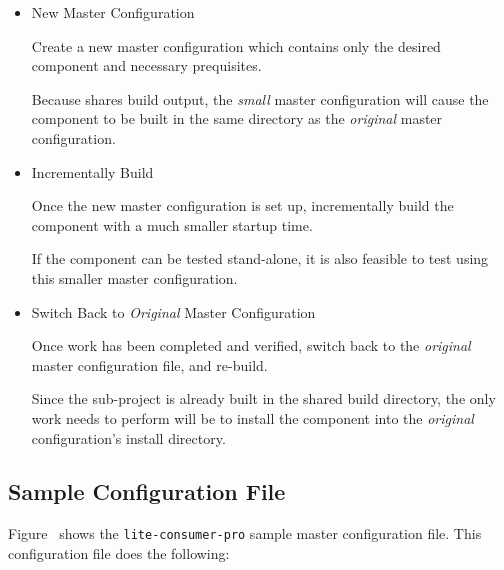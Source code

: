 \begin{itemize}
\item New Master Configuration

  Create a new master configuration which contains only the desired
  component and necessary prequisites.

  Because \lmsbw shares build output, the \emph{small} master
  configuration will cause the component to be built in the same
  directory as the \emph{original} master configuration.

\item Incrementally Build

  Once the new master configuration is set up, incrementally build the
  component with a much smaller startup time.

  If the component can be tested stand-alone, it is also feasible to
  test using this smaller master configuration.

\item Switch Back to \emph{Original} Master Configuration

  Once work has been completed and verified, switch back to the
  \emph{original} master configuration file, and re-build.

  Since the sub-project is already built in the shared build
  directory, the only work \lmsbw needs to perform will be to install
  the component into the \emph{original} configuration's install
  directory.
\end{itemize}

\subsection{Sample Configuration File}
Figure~ shows the
\texttt{lite-consumer-pro} sample master configuration file.  This
configuration file does the following:

